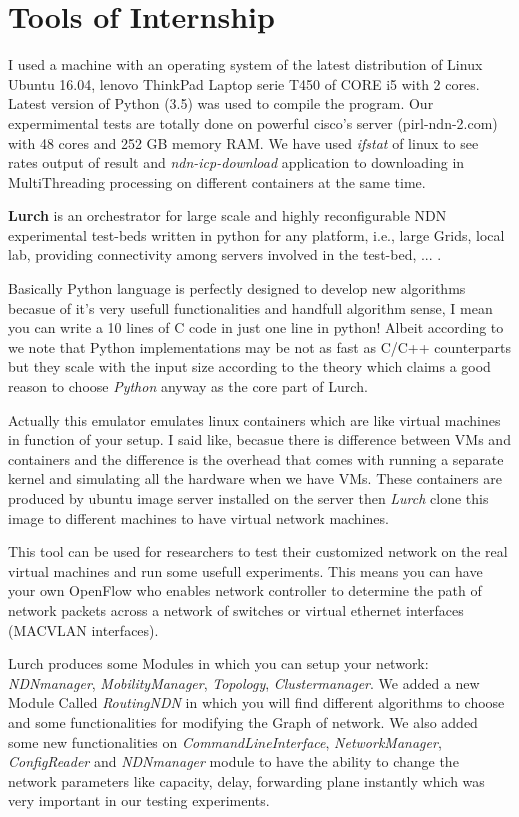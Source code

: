 \section{Tools of Internship}

I used a machine with an operating system of the latest distribution of Linux Ubuntu 16.04, lenovo ThinkPad Laptop serie T450 of CORE i5 with 2 cores. Latest version of Python (3.5) was used to compile the program.  Our expermimental tests are totally done on powerful cisco's server (pirl-ndn-2.com) with 48 cores and 252 GB memory RAM. We have used \textit{ifstat} of linux to see rates output of result and \textit{ndn-icp-download} application to downloading in MultiThreading processing on different containers at the same time.

\textbf{\LARGE{Lurch}} is an orchestrator for large scale and highly reconfigurable NDN experimental test-beds written in python for any platform, i.e., large Grids, local lab, providing connectivity among servers involved in the test-bed, ... .

Basically Python language is perfectly designed to develop new algorithms becasue of it's very usefull functionalities and handfull algorithm sense, I mean you can write a 10 lines of C code in just one line in python! Albeit according to \cite{python} we note that Python implementations may be not as fast as C/C++ counterparts but they scale with the input size according to the theory which claims a good reason to choose \textit{Python} anyway as the core part of Lurch.

Actually this emulator emulates linux containers which are like virtual machines in function of your setup. I said like, becasue there is difference between VMs and containers and the difference is the overhead that comes with running a separate kernel and simulating all the hardware when we have VMs. These containers are produced by ubuntu image server installed on the server then \textit{Lurch} clone this image to different machines to have virtual network machines. 

This tool can be used for researchers to test their customized network on the real virtual machines and run some usefull experiments. This means you can have your own OpenFlow who enables network controller to determine the path of network packets across a network of switches or virtual ethernet interfaces (MACVLAN interfaces).

Lurch produces some Modules in which you can setup your network: \textit{NDNmanager}, \textit{MobilityManager}, \textit{Topology}, \textit{Clustermanager}. We added a new Module Called \textit{RoutingNDN} in which you will find different algorithms to choose and some functionalities for modifying the Graph of network.
We also added some new functionalities on \textit{CommandLineInterface}, \textit{NetworkManager}, \textit{ConfigReader} and \textit{NDNmanager} module to have the ability to change the network parameters like capacity, delay, forwarding plane instantly which was very important in our testing experiments.

